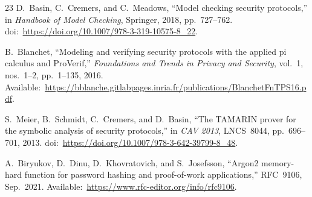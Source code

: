 \documentclass[conference]{IEEEtran}
\begin{document}
\begin{thebibliography}{23}
D.~Basin, C.~Cremers, and C.~Meadows, ``Model checking security protocols,'' in \emph{Handbook of Model Checking}, Springer, 2018, pp.~727--762. doi:~\url{https://doi.org/10.1007/978-3-319-10575-8_22}.

B.~Blanchet, ``Modeling and verifying security protocols with the applied pi calculus and ProVerif,'' \emph{Foundations and Trends in Privacy and Security}, vol.~1, nos.~1--2, pp.~1--135, 2016. Available:~\url{https://bblanche.gitlabpages.inria.fr/publications/BlanchetFnTPS16.pdf}.

S.~Meier, B.~Schmidt, C.~Cremers, and D.~Basin, ``The TAMARIN prover for the symbolic analysis of security protocols,'' in \emph{CAV 2013}, LNCS~8044, pp.~696--701, 2013. doi:~\url{https://doi.org/10.1007/978-3-642-39799-8_48}.

A.~Biryukov, D.~Dinu, D.~Khovratovich, and S.~Josefsson, ``Argon2 memory-hard function for password hashing and proof-of-work applications,'' RFC~9106, Sep.~2021. Available:~\url{https://www.rfc-editor.org/info/rfc9106}.

\end{thebibliography}

\end{document}

